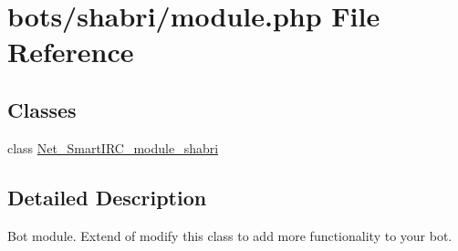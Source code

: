 \hypertarget{shabri_2module_8php}{}\section{bots/shabri/module.php File Reference}
\label{shabri_2module_8php}
\subsection*{Classes}
\begin{DoxyCompactItemize}
\item 
class \hyperlink{classNet__SmartIRC__module__shabri}{Net\+\_\+\+Smart\+I\+R\+C\+\_\+module\+\_\+shabri}
\end{DoxyCompactItemize}


\subsection{Detailed Description}
Bot module. Extend of modify this class to add more functionality to your bot. 